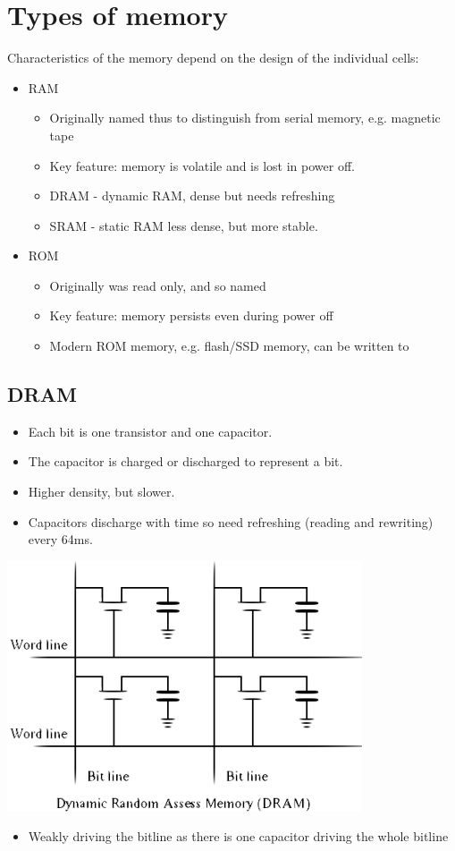 \documentclass{article}[18pt]
\begin{document}
\section{Types of memory}
Characteristics of the memory depend on the design of the individual cells:
\begin{itemize}
	\item RAM
	\begin{itemize}
		\item Originally named thus to distinguish from serial memory, e.g. magnetic tape
		\item Key feature: memory is volatile and is lost in power off.
		\item DRAM - dynamic RAM, dense but needs refreshing
		\item SRAM - static RAM less dense, but more stable.
	\end{itemize}
	\item ROM
	\begin{itemize}
		\item Originally was read only, and so named
		\item Key feature: memory persists even during power off
		\item Modern ROM memory, e.g. flash/SSD memory, can be written to
	\end{itemize}
\end{itemize}
\subsection{DRAM}
\begin{itemize}
	\item Each bit is one transistor and one capacitor. 
	\item The capacitor is charged or discharged to represent a bit. 
	\item Higher density, but slower.
	\item Capacitors discharge with time so need refreshing (reading and rewriting) every 64ms.
\end{itemize}
\begin{center}
	\includegraphics[scale=0.7]{DRAM}
\end{center}
\begin{itemize}
	\item Weakly driving the bitline as there is one capacitor driving the whole bitline
\end{itemize}
\end{document}
